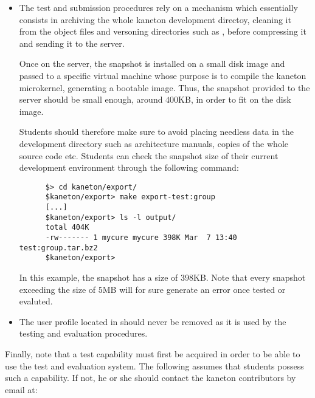 \begin{itemize}
  \item
    The test and submission procedures rely on a mechanism which essentially
    consists in archiving the whole kaneton development directoy, cleaning it
    from the object files and versoning directories such as ,
     \etc{} before compressing it and sending it to the server.

    \-

    Once on the server, the snapshot is installed on a small disk image and
    passed to a specific virtual machine whose purpose is to compile the
    kaneton microkernel, generating a bootable image. Thus, the snapshot
    provided to the server should be small enough, around $400$KB, in order
    to fit on the disk image.

    \-

    Students should therefore make sure to avoid placing needless data in
    the development directory such as architecture manuals, copies of
    the whole source code etc. Students can check the snapshot size of their
    current development environment through the following command:

    \begin{verbatim}
      $> cd kaneton/export/
      $kaneton/export> make export-test:group
      [...]
      $kaneton/export> ls -l output/
      total 404K
      -rw------- 1 mycure mycure 398K Mar  7 13:40 test:group.tar.bz2
      $kaneton/export> 
    \end{verbatim}

    In this example, the snapshot has a size of $398$KB. Note that every
    snapshot exceeding the size of $5$MB will for sure generate an error
    once tested or evaluted.
  \item
    The  user profile located in
     should never be removed as
    it is used by the testing and evaluation procedures.
\end{itemize}

Finally, note that a test capability must first be acquired in order to be
able to use the test and evaluation system. The following assumes that
students possess such a capability. If not, he or she should contact the
kaneton contributors by email at:

\begin{center}
\end{center}

